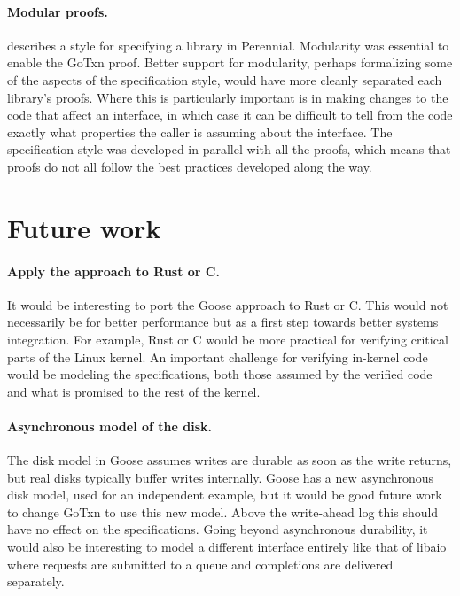 \paragraph{Modular proofs.}
 describes a style for specifying a library in Perennial.
Modularity was essential to enable the GoTxn proof. Better support for
modularity, perhaps formalizing some of the aspects of the specification style,
would have more cleanly separated each library's proofs. Where this is
particularly important is in making changes to the code that affect an
interface, in which case it can be difficult to tell from the code exactly what
properties the caller is assuming about the interface. The specification style
was developed in parallel with all the proofs, which means that proofs do not
all follow the best practices developed along the way.

\section{Future work}

\paragraph{Apply the approach to Rust or C.} It would be interesting to port
the Goose approach to Rust or C. This would not necessarily be for better
performance but as a first step towards better systems integration. For example,
Rust or C would be more practical for verifying critical parts of the Linux
kernel. An important challenge for verifying in-kernel code would be modeling
the specifications, both those assumed by the verified code and what is promised
to the rest of the kernel.

\paragraph{Asynchronous model of the disk.} The disk model in Goose assumes
writes are durable as soon as the write returns, but real disks typically buffer
writes internally. Goose has a new asynchronous disk model, used for an
independent example, but it would be good future work to change GoTxn to use
this new model. Above the write-ahead log this should have no effect on the
specifications. Going beyond asynchronous durability, it would also be
interesting to model a different interface entirely like that of libaio where
requests are submitted to a queue and completions are delivered separately.

